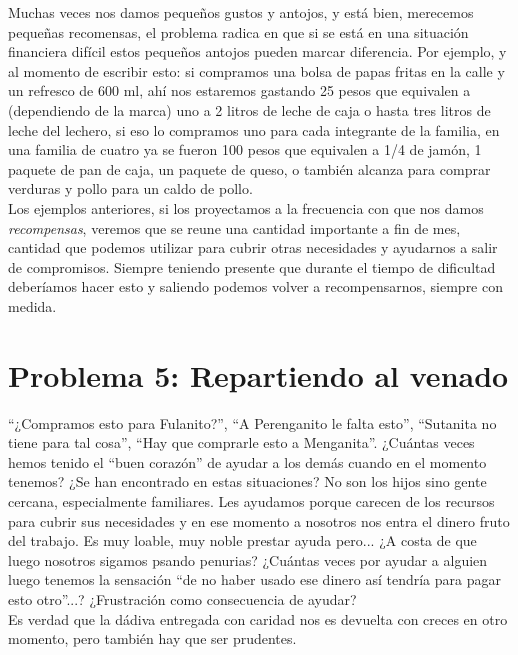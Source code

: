 \documentclass[12pt]{book} %
\begin{document}
Muchas veces nos damos pequeños gustos y antojos, y está bien, merecemos pequeñas recomensas, el problema radica en que si se está en una situación financiera difícil estos pequeños antojos pueden marcar diferencia. Por ejemplo, y al momento de escribir esto: si compramos una bolsa de papas fritas en la calle y un refresco de 600 ml, ahí nos estaremos gastando 25 pesos que equivalen a (dependiendo de la marca) uno a 2 litros de leche de caja o hasta tres litros de leche del lechero, si eso lo compramos uno para cada integrante de la familia, en una familia de cuatro ya se fueron 100 pesos que equivalen a 1/4 de jamón, 1 paquete de pan de caja, un paquete de queso, o también alcanza para comprar verduras y pollo para un caldo de pollo.\\

Los ejemplos anteriores, si los proyectamos a la frecuencia con que nos damos \emph{recompensas}, veremos que se reune una cantidad importante a fin de mes, cantidad que podemos utilizar para cubrir otras necesidades y ayudarnos a salir de compromisos. Siempre teniendo presente que durante el tiempo de dificultad deberíamos hacer esto y saliendo podemos volver a recompensarnos, siempre con medida.\\

\chapter[Repartiendo al venado]{Problema 5: Repartiendo al venado}
``¿Compramos esto para Fulanito?'', ``A Perenganito le falta esto'', ``Sutanita no tiene para tal cosa'', ``Hay que comprarle esto a Menganita''. ¿Cuántas veces hemos tenido el ``buen corazón'' de ayudar a los demás cuando en el momento tenemos? ¿Se han encontrado en estas situaciones? No son los hijos sino gente cercana, especialmente familiares. Les ayudamos porque carecen de los recursos para cubrir sus necesidades y en ese momento a nosotros nos entra el dinero fruto del trabajo. Es muy loable, muy noble prestar ayuda pero... ¿A costa de que luego nosotros sigamos psando penurias? ¿Cuántas veces por ayudar a alguien luego tenemos la sensación ``de no haber usado ese dinero así tendría para pagar esto otro''...? ¿Frustración como consecuencia de ayudar?\\
Es verdad que la dádiva entregada con caridad nos es devuelta con creces en otro momento,  pero también hay que ser prudentes.
\end{document}
